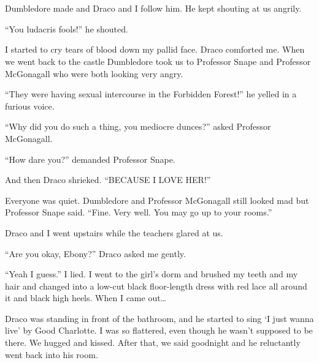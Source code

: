 \section{}



Dumbledore made and Draco and I follow him. He kept shouting at us angrily.

\enquote{You ludacris fools!} he shouted.

I started to cry tears of blood down my pallid face. Draco comforted me. When we went back to the castle Dumbledore took us to Professor Snape and Professor McGonagall who were both looking very angry.

\enquote{They were having sexual intercourse in the Forbidden Forest!} he yelled in a furious voice.

\enquote{Why did you do such a thing, you mediocre dunces?} asked Professor McGonagall.

\enquote{How dare you?} demanded Professor Snape.

And then Draco shrieked. \enquote{BECAUSE I LOVE HER!}

Everyone was quiet. Dumbledore and Professor McGonagall still looked mad but Professor Snape said. \enquote{Fine. Very well. You may go up to your rooms.}

Draco and I went upstairs while the teachers glared at us.

\enquote{Are you okay, Ebony?} Draco asked me gently.

\enquote{Yeah I guess.} I lied. I went to the girl's dorm and brushed my teeth and my hair and changed into a low-cut black floor-length dress with red lace all around it and black high heels. When I came out\ldots{}

Draco was standing in front of the bathroom, and he started to sing \enquote*{I just wanna live} by Good Charlotte. I was so flattered, even though he wasn't supposed to be there. We hugged and kissed. After that, we said goodnight and he reluctantly went back into his room.
